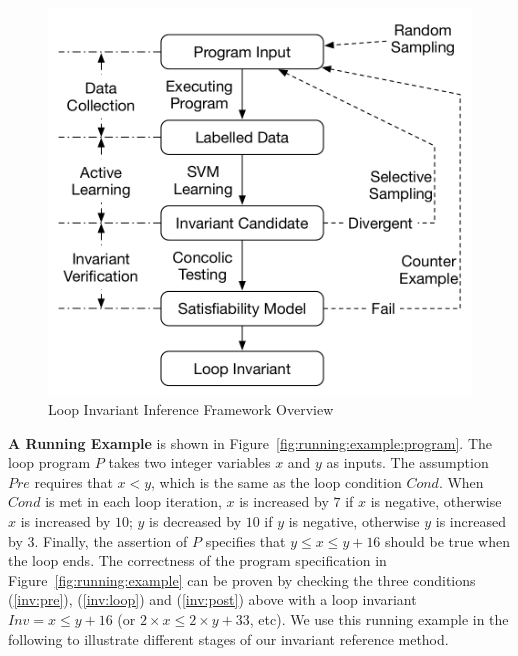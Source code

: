\begin{figure}[t]
    \centering
    \includegraphics[scale=0.45]{figures/overview.pdf}
    \caption{Loop Invariant Inference Framework Overview}
    \label{fig:overview}
\end{figure}

\medskip\noindent
\textbf{A Running Example}
is shown in Figure~\ref{fig:running:example:program}. 
The loop program $P$ takes two integer variables $x$ and $y$ as inputs. 
The assumption $\mathit{Pre}$ requires that $x < y$, 
which is the same as the loop condition $\mathit{Cond}$. 
When $\mathit{Cond}$ is met in each loop iteration, 
$x$ is increased by $7$ if $x$ is negative, otherwise $x$ is increased by $10$; 
$y$ is decreased by $10$ if $y$ is negative, otherwise $y$ is increased by $3$. 
Finally, the assertion of $P$ specifies that 
$y \le x \le y + 16$ should be true when the loop ends. 
The correctness of the program specification in Figure~\ref{fig:running:example} 
can be proven by checking the three conditions 
(\ref{inv:pre}), (\ref{inv:loop}) and (\ref{inv:post}) above 
with a loop invariant $\mathit{Inv} = x \le y + 16$ (or $2 \times x \le 2 \times y + 33$, etc). 
We use this running example in the following 
to illustrate different stages of our invariant reference method. 

